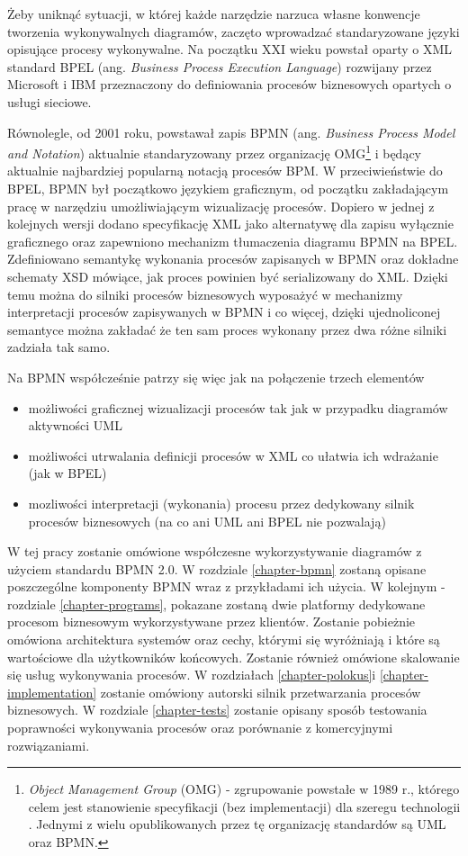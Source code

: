 \documentclass[declaration,shortabstract,mgr]{iithesis}
\newcommand{\bpmn}{BPMN }
\begin{document}
Żeby uniknąć sytuacji, w której każde narzędzie narzuca własne konwencje tworzenia wykonywalnych diagramów, zaczęto wprowadzać standaryzowane języki opisujące procesy wykonywalne. Na początku XXI wieku powstał oparty o XML standard BPEL (ang. \textit{Business Process Execution Language}) rozwijany przez Microsoft i IBM przeznaczony do definiowania procesów biznesowych opartych o usługi sieciowe.

Równolegle, od 2001 roku, powstawał zapis \bpmn (ang. \textit{Business Process Model and Notation}) aktualnie standaryzowany przez organizację OMG\footnote{\textit{Object Management Group} (OMG) - zgrupowanie powstałe w 1989 r., którego celem jest stanowienie specyfikacji (bez implementacji) dla szeregu technologii \cite{omg-wiki}. Jednymi z wielu opublikowanych przez tę organizację standardów są UML oraz BPMN.} i będący aktualnie najbardziej popularną notacją procesów BPM. W przeciwieństwie do BPEL, BPMN był początkowo językiem graficznym, od początku zakładającym pracę w narzędziu umożliwiającym
wizualizację procesów. Dopiero w jednej z kolejnych wersji dodano
specyfikację XML jako alternatywę dla zapisu wyłącznie graficznego 
oraz zapewniono mechanizm tłumaczenia diagramu \bpmn na BPEL.
Zdefiniowano semantykę wykonania procesów zapisanych w \bpmn oraz dokładne schematy XSD mówiące, jak proces powinien być serializowany do XML. Dzięki temu można do silniki procesów biznesowych wyposażyć w mechanizmy interpretacji procesów zapisywanych w \bpmn i co więcej,
dzięki ujednoliconej semantyce można zakładać że ten sam proces
wykonany przez dwa różne silniki zadziała tak samo. 

Na \bpmn współcześnie patrzy się więc jak na połączenie trzech elementów

\begin{itemize}
\item możliwości graficznej wizualizacji procesów tak jak w przypadku
diagramów aktywności UML
\item możliwości utrwalania definicji procesów w XML co ułatwia
ich wdrażanie (jak w BPEL)
\item mozliwości interpretacji (wykonania) procesu przez dedykowany
silnik procesów biznesowych (na co ani UML ani BPEL nie pozwalają)
\end{itemize}

W tej pracy zostanie omówione współczesne wykorzystywanie diagramów z użyciem standardu \bpmn 2.0. W rozdziale \ref{chapter-bpmn} zostaną opisane poszczególne komponenty \bpmn wraz z przykładami ich użycia. W kolejnym - rozdziale \ref{chapter-programs}, pokazane zostaną dwie platformy dedykowane procesom biznesowym wykorzystywane przez klientów. Zostanie pobieżnie omówiona architektura systemów oraz cechy, którymi się wyróżniają i które są wartościowe dla użytkowników końcowych. Zostanie również omówione skalowanie się usług wykonywania procesów. W rozdziałach \ref{chapter-polokus}i \ref{chapter-implementation} zostanie omówiony autorski silnik przetwarzania procesów biznesowych. W rozdziale \ref{chapter-tests} zostanie opisany sposób testowania poprawności wykonywania procesów oraz porównanie z komercyjnymi rozwiązaniami.
\end{document}
